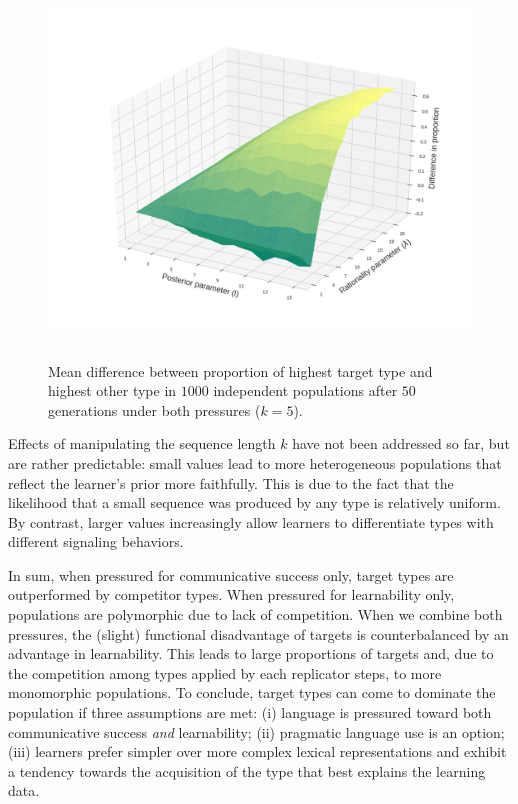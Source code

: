 \documentclass[a4paper, 11pt]{article}
\theoremstyle{Satz}
\begin{document}
\begin{figure}[t]
\centering
\includegraphics[width=1\textwidth,height=10cm,keepaspectratio]{./plots/fig4-3d-incumbents-difference} %
\caption{Mean difference between proportion of highest target type and highest other type in
  $1000$ independent populations after $50$ generations under both pressures ($k = 5$).}
\label{fig:diff}
\end{figure}

Effects of manipulating the sequence length $k$ have not been addressed so far, but are rather
predictable: small values lead to more heterogeneous populations that reflect the learner's
prior more faithfully. This is due to the fact that the likelihood that a small sequence was
produced by any type is relatively uniform. By contrast, larger values increasingly allow
learners to differentiate types with different signaling behaviors.

In sum, when pressured for communicative success only, target types are outperformed by
competitor types. When pressured for learnability only, populations are polymorphic due to lack
of competition. When we combine both pressures, the (slight) functional disadvantage of targets
is counterbalanced by an advantage in learnability. This leads to large proportions of targets
and, due to the competition among types applied by each replicator steps, to more monomorphic
populations. To conclude, target types can come to dominate the population if three assumptions
are met: (i) language is pressured toward both communicative success {\em and} learnability;
(ii) pragmatic language use is an option; (iii) learners prefer simpler over more complex
lexical representations and exhibit a tendency towards the acquisition of the type that best
explains the learning data.
\end{document}

